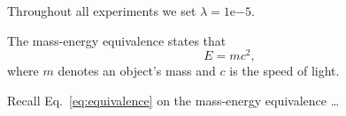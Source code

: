 Throughout all experiments we set $\lambda = 1\mathrm{e}{-5}$. 

The mass-energy equivalence states that
\begin{equation}
  E = m c^2,  \label{eq:equivalence}
\end{equation}
where $m$ denotes an object's mass and $c$ is the speed of light.

Recall Eq.~\eqref{eq:equivalence} on the mass-energy equivalence \dots

